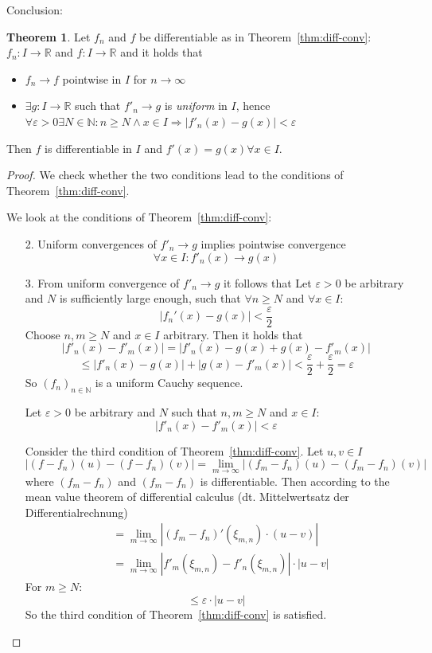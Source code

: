 \documentclass[a4paper,landscape,twocolumn]{article}
\theoremstyle{definition}
\newtheorem{theorem}{Theorem}
\newcommand\abs[1]{\left|#1\right|}
\begin{document}
Conclusion:
\begin{theorem}
  \label{thm:concl}
  Let $f_n$ and $f$ be differentiable as in Theorem~\ref{thm:diff-conv}:
  $f_n: I \to \mathbb R$ and $f: I \to \mathbb R$ and it holds that
  \begin{itemize}
    \item $f_n \to f$ pointwise in $I$ for $n \to \infty$
    \item $\exists g: I  \to \mathbb R$ such that $f'_n \to g$ is \emph{uniform} in $I$,
      hence $\forall \varepsilon > 0 \exists N \in \mathbb N:
      n \geq N \land x \in I \Rightarrow \abs{f'_n(x) - g(x)} < \varepsilon$
  \end{itemize}
  Then $f$ is differentiable in $I$ and $f'(x) = g(x) \forall x \in I$.
\end{theorem}
\begin{proof}
  We check whether the two conditions lead to the conditions of Theorem~\ref{thm:diff-conv}.

  We look at the conditions of Theorem~\ref{thm:diff-conv}:
  \begin{itemize}
    \item[2.] Uniform convergences of $f'_n \to g$ implies pointwise convergence
      \[ \forall x \in I: f'_n(x) \to g(x) \]
    \item[3.] From uniform convergence of $f'_n \to g$ it follows that
      Let $\varepsilon > 0$ be arbitrary and $N$ is sufficiently large enough, such that
      $\forall n \geq N$ and $\forall x \in I$:
      \[ \abs{f_n'(x) - g(x)} < \frac\varepsilon2 \]
      Choose $n,m \geq N$ and $x \in I$ arbitrary. Then it holds that
      \[ \abs{f'_n(x) - f'_m(x)} = \abs{f'_n(x) - g(x) + g(x) - f'_m(x)} \]
      \[ \leq \abs{f'_n(x) - g(x)} + \abs{g(x) - f'_m(x)} < \frac\varepsilon2 + \frac\varepsilon2 = \varepsilon \]
      So $(f_n)_{n\in\mathbb N}$ is a uniform Cauchy sequence.

      Let $\varepsilon > 0$ be arbitrary and $N$ such that $n,m \geq N$ and $x \in I$:
      \[ \abs{f'_n(x) - f'_m(x)} < \varepsilon \]

      Consider the third condition of Theorem~\ref{thm:diff-conv}. Let $u,v \in I$
      \[ \abs{(f - f_n)(u) - (f - f_n)(v)} = \lim_{m\to\infty} \abs{(f_m - f_n)(u) - (f_m - f_n)(v)} \]
      where $(f_m - f_n)$ and $(f_m - f_n)$ is differentiable. Then according to the
      mean value theorem of differential calculus (dt. Mittelwertsatz der Differentialrechnung)
      \begin{align*}
        &= \lim_{m\to\infty} \abs{(f_m - f_n)'(\xi_{m,n}) \cdot (u - v)} \\
        &= \lim_{m\to\infty} \abs{f'_m(\xi_{m,n}) - f'_n(\xi_{m,n})} \cdot \abs{u - v}
      \end{align*}
      For $m \geq N$:
      \[ \leq \varepsilon \cdot \abs{u - v} \]
      So the third condition of Theorem~\ref{thm:diff-conv} is satisfied.
  \end{itemize}
\end{proof}
\end{document}
